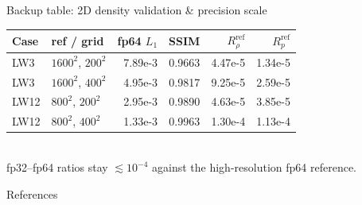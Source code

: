 \documentclass[xcolor=table]{beamer}
\begin{document}
\begin{frame}{Backup table: 2D density validation \& precision scale}
\\[0.4em]
\small
\begin{tabular}{@{}llrcrr@{}}
\toprule
Case & ref / grid & fp64 $L_1$ & SSIM & $R_\rho^{\mathrm{ref}}$ & $R_p^{\mathrm{ref}}$ \\
\midrule
LW3  & $1600^2$, $200^2$ & 7.89e-3 & 0.9663 & 4.47e-5 & 1.34e-5 \\
LW3  & $1600^2$, $400^2$ & 4.95e-3 & 0.9817 & 9.25e-5 & 2.59e-5 \\
LW12 & $800^2$, $200^2$  & 2.95e-3 & 0.9890 & 4.63e-5 & 3.85e-5 \\
LW12 & $800^2$, $400^2$  & 1.33e-3 & 0.9963 & 1.30e-4 & 1.13e-4 \\
\bottomrule
\end{tabular}\\[0.4em]
\footnotesize fp32--fp64 ratios stay $\lesssim 10^{-4}$ against the
high-resolution fp64 reference.
\end{frame}

\begin{frame}[allowframebreaks]{References}
\tiny
\nocite{*}


\end{frame}
\end{document}
